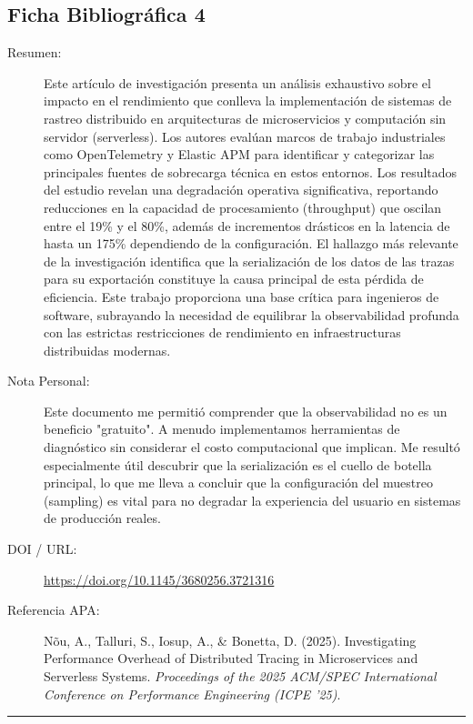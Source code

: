 \documentclass[12pt]{article}
\begin{document}
\subsection{Ficha Bibliográfica 4}
\begin{description}
    \item[Resumen:] Este artículo de investigación presenta un análisis exhaustivo sobre el impacto en el rendimiento que conlleva la implementación de sistemas de rastreo distribuido en arquitecturas de microservicios y computación sin servidor (serverless). Los autores evalúan marcos de trabajo industriales como OpenTelemetry y Elastic APM para identificar y categorizar las principales fuentes de sobrecarga técnica en estos entornos. Los resultados del estudio revelan una degradación operativa significativa, reportando reducciones en la capacidad de procesamiento (throughput) que oscilan entre el 19\% y el 80\%, además de incrementos drásticos en la latencia de hasta un 175\% dependiendo de la configuración. El hallazgo más relevante de la investigación identifica que la serialización de los datos de las trazas para su exportación constituye la causa principal de esta pérdida de eficiencia. Este trabajo proporciona una base crítica para ingenieros de software, subrayando la necesidad de equilibrar la observabilidad profunda con las estrictas restricciones de rendimiento en infraestructuras distribuidas modernas.
    \item[Nota Personal:] Este documento me permitió comprender que la observabilidad no es un beneficio "gratuito". A menudo implementamos herramientas de diagnóstico sin considerar el costo computacional que implican. Me resultó especialmente útil descubrir que la serialización es el cuello de botella principal, lo que me lleva a concluir que la configuración del muestreo (sampling) es vital para no degradar la experiencia del usuario en sistemas de producción reales.
    \item[DOI / URL:] \url{https://doi.org/10.1145/3680256.3721316}
    \item[Referencia APA:] Nõu, A., Talluri, S., Iosup, A., \& Bonetta, D. (2025). Investigating Performance Overhead of Distributed Tracing in Microservices and Serverless Systems. \textit{Proceedings of the 2025 ACM/SPEC International Conference on Performance Engineering (ICPE '25)}.
\end{description}
\noindent\rule{\textwidth}{0.4pt}
\vspace{4.5cm}
\end{document}
